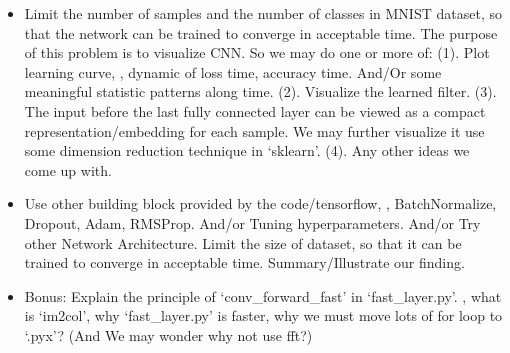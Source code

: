 \documentclass[12pt]{article}
\begin{document}
\begin{itemize}
	\item Limit the number of samples and the number of classes in MNIST dataset, so that the network can be trained to converge in acceptable time. The purpose of this problem is to visualize CNN. So we may do one or more of: (1). Plot learning curve, \ie, dynamic of loss \wrt time, accuracy \wrt time. And/Or some meaningful statistic patterns along time. (2). Visualize the learned filter. (3). The input before the last fully connected layer can be viewed as a compact representation/embedding for each sample. We may further visualize it use some dimension reduction technique in `sklearn'. (4). Any other ideas we come up with. 
	\item Use other building block provided by the code/tensorflow, \eg, BatchNormalize, Dropout, Adam, RMSProp. And/or Tuning  hyperparameters. And/or Try other Network Architecture. Limit the size of dataset, so that it can be trained to converge in acceptable time. Summary/Illustrate our finding.  
	\item Bonus: Explain the principle of `conv\_forward\_fast' in `fast\_layer.py'. \eg, what is `im2col', why `fast\_layer.py' is faster, why we must move lots of for loop to `.pyx'? (And We may wonder why not use fft?)
\end{itemize}
\end{document}
